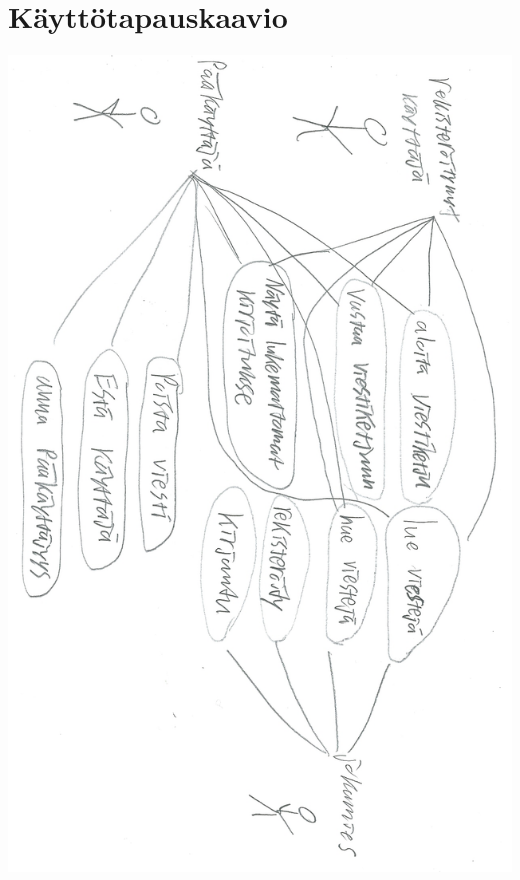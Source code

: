 \documentclass[a4paper, 12pt, finnish]{article}
\begin{document}
\section{Käyttötapauskaavio}
\includegraphics[width=\textwidth,height=\textheight,keepaspectratio]{kayttotapauskaavio.png}
\end{document}

